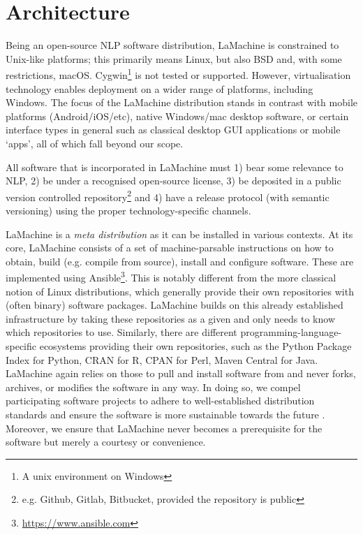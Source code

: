 \documentclass[a4paper,11pt]{article}
\begin{document}
\section{Architecture}

Being an open-source NLP software distribution, LaMachine is constrained to Unix-like platforms; this primarily means
Linux, but also BSD and, with some restrictions, macOS. Cygwin\footnote{A unix environment on Windows} is not tested or
supported.  However, virtualisation technology enables deployment on a wider range of platforms, including Windows. The
focus of the LaMachine distribution stands in contrast with mobile platforms (Android/iOS/etc), native Windows/mac
desktop software, or certain interface types in general such as classical desktop GUI applications or mobile `apps', all
of which fall beyond our scope.

All software that is incorporated in LaMachine must 1) bear some relevance to NLP, 2) be under a recognised
open-source license, 3) be deposited in a public version controlled repository\footnote{e.g. Github, Gitlab, Bitbucket,
provided the repository is public} and 4) have a release protocol (with semantic versioning) using the proper
technology-specific channels.

LaMachine is a \emph{meta distribution} as it can be installed in various contexts. At its core, LaMachine consists of a
set of machine-parsable instructions on how to obtain, build (e.g. compile from source), install and configure software.
These are implemented using Ansible\footnote{\url{https://www.ansible.com}}.  This is notably different from the more
classical notion of Linux distributions, which generally provide their own repositories with (often binary) software
packages. LaMachine builds on this already established infrastructure by taking these repositories as a given and only
needs to know which repositories to use.  Similarly, there are different programming-language-specific ecosystems
providing their own repositories, such as the Python Package Index for Python, CRAN for R, CPAN for Perl, Maven Central
for Java.  LaMachine again relies on those to pull and install software from and never forks, archives, or modifies the
software in any way. In doing so, we compel participating software projects to adhere to well-established distribution
standards and ensure the software is more sustainable towards the future \cite{softwarequality}. Moreover, we ensure
that LaMachine never becomes a prerequisite for the software but merely a courtesy or convenience.
\end{document}
